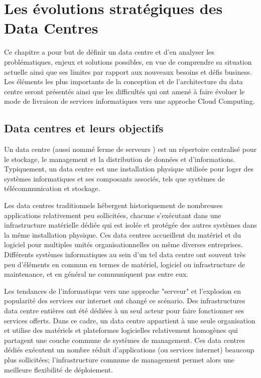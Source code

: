 
\chapter{Les évolutions stratégiques des Data Centres}
\label{chap-1}

Ce chapitre a pour but de définir un data centre et d'en analyser les problématiques, enjeux et solutions possibles, en vue de comprendre sa situation actuelle ainsi que ses limites par rapport aux nouveaux besoins et défis business. Les éléments les plus importants de la conception et de l'architecture du data centre seront présentés ainsi que les difficultés qui ont amené à faire évoluer le mode de livraison de services informatiques vers une approche Cloud Computing.

\section{Data centres et leurs objectifs}

Un data centre (aussi nommé \og ferme de serveurs \fg{}) est un répertoire centralisé pour le stockage, le management et la distribution de données et d'informations. Typiquement, un data centre est une installation physique utilisée pour loger des systèmes informatiques et ses composants associés, tels que systèmes de télécommunication et stockage. 

Les data centres traditionnels hébergent historiquement de nombreuses applications relativement peu sollicitées, chacune s'exécutant dans une infrastructure matérielle dédiée qui est isolée et protégée des autres systèmes dans la même installation physique. Ces data centres accueillent du matériel et du logiciel pour multiples unités organisationnelles ou même diverses entreprises. Différents systèmes informatiques au sein d'un tel data centre ont souvent très peu d'éléments en commun en termes de matériel, logiciel ou infrastructure de maintenance, et en général ne communiquent pas entre eux. 


Les tendances de l'informatique vers une approche "serveur" et l'explosion en popularité des services sur internet ont changé ce scénario. Des infrastructures data centre entières ont été dédiées à un seul acteur pour faire fonctionner ses services offerts. Dans ce cadre, un data centre appartient à une seule organisation et utilise des matériels et plateformes logicielles relativement homogènes qui partagent une couche commune de systèmes de management. Ces data centres dédiés exécutent un nombre réduit d'applications (ou services internet) beaucoup plus sollicitées; l'infrastructure commune de management permet alors une meilleure flexibilité de déploiement. 

